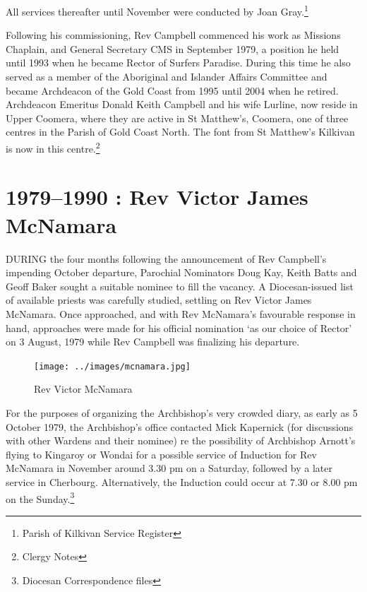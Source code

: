 All services thereafter until November were conducted by Joan Gray.\footnote{Parish of Kilkivan Service Register}


Following his commissioning, Rev Campbell commenced his work as Missions Chaplain, and General Secretary CMS in September 1979, a position he held until 1993 when he became Rector of Surfers Paradise. During this time he also served as a member of the Aboriginal and Islander Affairs Committee and became Archdeacon of the Gold Coast from 1995 until 2004 when he retired. Archdeacon Emeritus Donald Keith Campbell and his wife Lurline, now reside in Upper Coomera, where they are active in St Matthew's, Coomera, one of three centres in the Parish of Gold Coast North. The font from St Matthew's Kilkivan is now in this centre.\footnote{Clergy Notes}


\balance


\printendnotes[custom]
\setcounter{endnote}{0}
\chapter{1979--1990 : Rev Victor James McNamara}
\nobalance


\lettrine[lines=3]{D}{URING}
 the four months following the announcement of Rev Campbell's impending October departure, Parochial Nominators Doug Kay, Keith Batts and Geoff Baker sought a suitable nominee to fill the vacancy. A Diocesan-issued list of available priests was carefully studied, settling on Rev Victor James McNamara. Once approached, and with Rev McNamara's favourable response in hand, approaches were made for his official nomination `as our choice of Rector' on 3 August, 1979 while Rev Campbell was finalizing his departure.







\begin{figure}
\begin{center}
\texttt{[image: ../images/mcnamara.jpg]}
\caption{Rev Victor McNamara}
\end{center}
\end{figure}




For the purposes of organizing the Archbishop's very crowded diary, as early as 5 October 1979, the Archbishop's office contacted Mick Kapernick (for discussions with other Wardens and their nominee) re the possibility of Archbishop Arnott's flying to Kingaroy or Wondai for a possible service of Induction for Rev McNamara in November around 3.30 pm on a Saturday, followed by a later service in Cherbourg. Alternatively, the Induction could occur at 7.30 or 8.00 pm on the Sunday.\footnote{Diocesan Correspondence files}


